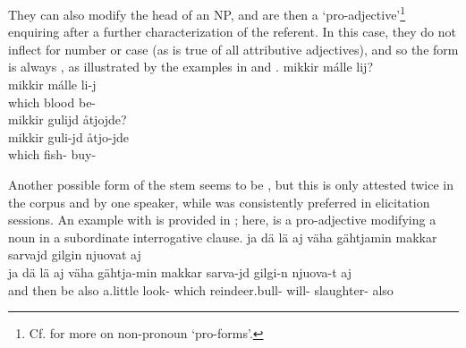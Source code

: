 They can also modify the head of an NP, and are then a ‘pro-adjective’\footnote{Cf. \citet[31-34]{SchachterShopen2007} for more on non-pronoun ‘pro-forms’.} enquiring after a further characterization of the referent. In this case, they do not inflect for number or case (as is true of all attributive adjectives), and so the form is always , as illustrated by the examples in  and . %
\ea\label{QpronounDEMGeneralEx3}
\glll	mikkir málle lij?\\
	mikkir málle li-j\\
	which blood\BS{} be-\\\nopagebreak
{}	
\z
\ea\label{QpronounDEMGeneralEx4}
\glll	mikkir gulijd åtjojde?\\
	mikkir guli-jd åtjo-jde\\
	which fish- buy-\\\nopagebreak
{}	
\z

Another possible form of the stem seems to be , but this is only attested twice in the corpus and by one speaker, while  was consistently preferred in elicitation sessions. %
An example with  is provided in ; here,  is a pro-adjective modifying a noun in a subordinate interrogative clause. 
\ea\label{QpronounDEMGeneralEx5}
\glll	ja dä lä aj väha gähtjamin makkar sarvajd gilgin njuovat aj\\
	ja dä lä aj väha gähtja-min makkar sarva-jd gilgi-n njuova-t aj\\
	and then be\BS{} also a.little look- which reindeer.bull- will- slaughter- also\\\nopagebreak
{}	
\z



